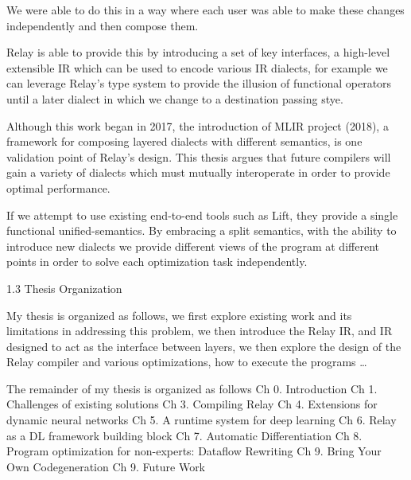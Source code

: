 We were able to do this in a way where each user was able to make these changes independently and then compose them.

Relay is able to provide this by introducing a set of key interfaces, a high-level extensible IR which can be used to encode various IR dialects, for example we can leverage Relay’s type system to provide the illusion of functional operators until a later dialect in which we change to a destination passing stye.

Although this work began in 2017, the introduction of MLIR project (2018), a framework for composing layered dialects with different semantics, is one validation point of Relay’s design. This thesis argues that future compilers will gain a variety of dialects which must mutually interoperate in order to provide optimal performance.

If we attempt to use existing end-to-end tools such as Lift, they provide a single functional unified-semantics. By embracing a split semantics, with the ability to introduce new dialects we provide different views of the program at different points in order to solve each optimization task independently.


1.3 Thesis Organization

My thesis is organized as follows, we first explore existing work and its limitations in addressing this problem, we then introduce the Relay IR, and IR designed to act as the interface between layers, we then explore the design of the Relay compiler and various optimizations, how to execute the programs …

The remainder of my thesis is organized as follows
Ch 0. Introduction
Ch 1. Challenges of existing solutions
Ch 3. Compiling Relay
Ch 4. Extensions for dynamic neural networks
Ch 5. A runtime system for deep learning
Ch 6. Relay as a DL framework building block
Ch 7. Automatic Differentiation
Ch 8. Program optimization for non-experts: Dataflow Rewriting
Ch 9. Bring Your Own Codegeneration
Ch 9. Future Work







